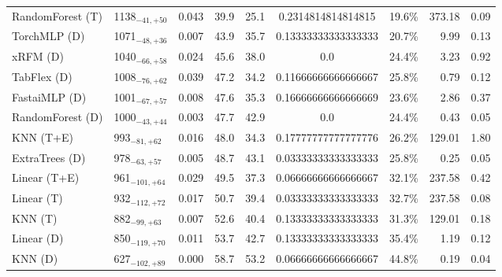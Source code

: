 \begin{tabular}{llcccccrr}
RandomForest (T) & 1138${}_{-41,+50}$ & 0.043 & 39.9 & 25.1 & 0.2314814814814815 & 19.6\% & 373.18 & 0.09 \\
TorchMLP (D) & 1071${}_{-48,+36}$ & 0.007 & 43.9 & 35.7 & 0.13333333333333333 & 20.7\% & 9.99 & 0.13 \\
xRFM (D) & 1040${}_{-66,+58}$ & 0.024 & 45.6 & 38.0 & 0.0 & 24.4\% & 3.23 & 0.92 \\
TabFlex (D) & 1008${}_{-76,+62}$ & 0.039 & 47.2 & 34.2 & 0.11666666666666667 & 25.8\% & 0.79 & 0.12 \\
FastaiMLP (D) & 1001${}_{-67,+57}$ & 0.008 & 47.6 & 35.3 & 0.16666666666666669 & 23.6\% & 2.86 & 0.37 \\
RandomForest (D) & 1000${}_{-43,+44}$ & 0.003 & 47.7 & 42.9 & 0.0 & 24.4\% & 0.43 & 0.05 \\
KNN (T+E) & 993${}_{-81,+62}$ & 0.016 & 48.0 & 34.3 & 0.17777777777777776 & 26.2\% & 129.01 & 1.80 \\
ExtraTrees (D) & 978${}_{-63,+57}$ & 0.005 & 48.7 & 43.1 & 0.03333333333333333 & 25.8\% & 0.25 & 0.05 \\
Linear (T+E) & 961${}_{-101,+64}$ & 0.029 & 49.5 & 37.3 & 0.06666666666666667 & 32.1\% & 237.58 & 0.42 \\
Linear (T) & 932${}_{-112,+72}$ & 0.017 & 50.7 & 39.4 & 0.03333333333333333 & 32.7\% & 237.58 & 0.08 \\
KNN (T) & 882${}_{-99,+63}$ & 0.007 & 52.6 & 40.4 & 0.13333333333333333 & 31.3\% & 129.01 & 0.18 \\
Linear (D) & 850${}_{-119,+70}$ & 0.011 & 53.7 & 42.7 & 0.13333333333333333 & 35.4\% & 1.19 & 0.12 \\
KNN (D) & 627${}_{-102,+89}$ & 0.000 & 58.7 & 53.2 & 0.06666666666666667 & 44.8\% & 0.19 & 0.04 \\
\bottomrule
\end{tabular}